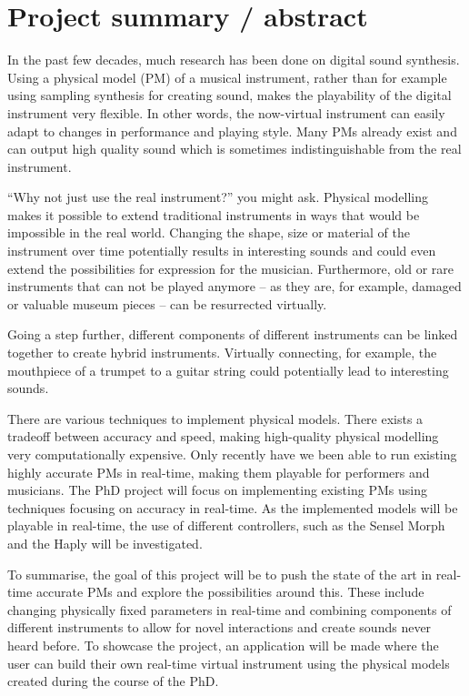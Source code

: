 \section{Project summary / abstract}

In the past few decades, much research has been done on digital sound synthesis. Using a physical model (PM) of a musical instrument, rather than for example using sampling synthesis for creating sound, makes the playability of the digital instrument very flexible. In other words, the now-virtual instrument can easily adapt to changes in performance and playing style. Many PMs already exist and can output high quality sound which is sometimes indistinguishable from the real instrument.

“Why not just use the real instrument?” you might ask. Physical modelling makes it possible to extend traditional instruments in ways that would be impossible in  the real world. Changing the shape, size or material of the instrument over time potentially results in interesting sounds and could even extend the possibilities for expression for the musician. Furthermore, old or rare instruments that can not be played anymore -- as they are, for example, damaged or valuable museum pieces -- can be resurrected virtually.

Going a step further, different components of different instruments can be linked together to create hybrid instruments. Virtually connecting, for example, the mouthpiece of a trumpet to a guitar string could potentially lead to interesting sounds.

There are various techniques to implement physical models. There exists a tradeoff between accuracy and speed, making high-quality physical modelling very computationally expensive. Only recently have we been able to run existing highly accurate PMs in real-time, making them playable for performers and musicians. The PhD project will focus on implementing existing PMs using techniques focusing on accuracy in real-time. As the implemented models will be playable in real-time, the use of different controllers, such as the Sensel Morph \cite{Sensel2019} and the Haply \cite{Haply2019} will be investigated.

To summarise, the goal of this project will be to push the state of the art in real-time accurate PMs and explore the possibilities around this. These include changing physically fixed parameters in real-time and combining components of different instruments to allow for novel interactions and create sounds never heard before. To showcase the project, an application will be made where the user can build their own real-time virtual instrument using the physical models created during the course of the PhD. 

